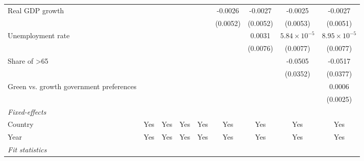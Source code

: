 \begin{table}[htbp]
\begin{tabular}{lcccccccc}
      Real GDP growth                                                        &          &          &                &                 & -0.0026         & -0.0027         & -0.0025               & -0.0027\\   
                                                                             &          &          &                &                 & (0.0052)        & (0.0052)        & (0.0053)              & (0.0051)\\   
      Unemployment rate                                                      &          &          &                &                 &                 & 0.0031          & $5.84\times 10^{-5}$  & $8.95\times 10^{-5}$\\    
                                                                             &          &          &                &                 &                 & (0.0076)        & (0.0077)              & (0.0077)\\   
      Share of >65                                                           &          &          &                &                 &                 &                 & -0.0505               & -0.0517\\   
                                                                             &          &          &                &                 &                 &                 & (0.0352)              & (0.0377)\\   
      Green vs. growth government preferences                                &          &          &                &                 &                 &                 &                       & 0.0006\\   
                                                                             &          &          &                &                 &                 &                 &                       & (0.0025)\\   
      \midrule
      \emph{Fixed-effects}\\
      Country                                                                & Yes      & Yes      & Yes            & Yes             & Yes             & Yes             & Yes                   & Yes\\  
      Year                                                                   & Yes      & Yes      & Yes            & Yes             & Yes             & Yes             & Yes                   & Yes\\  
      \midrule
      \emph{Fit statistics}\\

\end{tabular}
\end{table}
